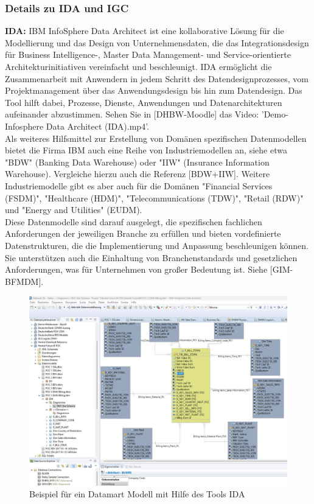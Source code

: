 \documentclass[12pt]{article}
\begin{document}
\subsubsection{Details zu IDA und IGC}
\textbf{IDA:} IBM InfoSphere Data Architect ist eine kollaborative Lösung für die Modellierung und das Design von Unternehmensdaten, die das Integrationsdesign für Business Intelligence-, Master Data Management- und Service-orientierte Architekturinitiativen vereinfacht und beschleunigt. IDA ermöglicht die Zusammenarbeit mit Anwendern in jedem Schritt des Datendesignprozesses, vom Projektmanagement über das Anwendungsdesign bis hin zum Datendesign. Das Tool hilft dabei, Prozesse, Dienste, Anwendungen und Datenarchitekturen aufeinander abzustimmen. Sehen Sie in [DHBW-Moodle] das Video: 'Demo-Infosphere Data Architect (IDA).mp4'. \\
Als weiteres Hilfsmittel zur Erstellung von Domänen spezifischen Datenmodellen bietet die Firma IBM auch eine Reihe von Industriemodellen an, siehe etwa "BDW" (Banking Data Warehouse) oder "IIW"  (Insurance Information Warehouse). Vergleiche hierzu auch die Referenz [BDW+IIW]. Weitere Industriemodelle gibt es aber auch für die Domänen "Financial Services (FSDM)", "Healthcare (HDM)", "Telecommunications (TDW)", "Retail (RDW)" und "Energy and Utilities" (EUDM). \\
Diese Datenmodelle sind darauf ausgelegt, die spezifischen fachlichen Anforderungen der jeweiligen Branche zu erfüllen und bieten vordefinierte Datenstrukturen, die die Implementierung und Anpassung beschleunigen können. Sie unterstützen auch die Einhaltung von Branchenstandards und gesetzlichen Anforderungen, was für Unternehmen von großer Bedeutung ist. Siehe [GIM-BFMDM].\\[0.2cm]
%
\begin{figure}[htp]
  \centering
  \hspace*{-0.3cm} 
  \includegraphics[width=1.1\textwidth]{IDA-Datamart}
  \caption{Beispiel für ein Datamart Modell mit Hilfe des Tools IDA}
  \label{fig:IDA-Datamart}
\end{figure}
\end{document}
